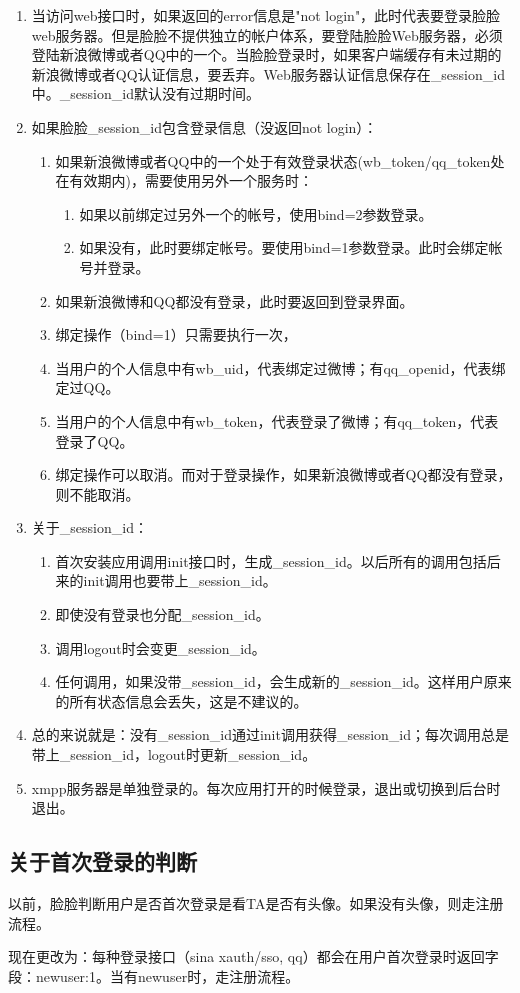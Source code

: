 \begin{enumerate}

\item 当访问web接口时，如果返回的error信息是"not login"，此时代表要登录脸脸web服务器。但是脸脸不提供独立的帐户体系，要登陆脸脸Web服务器，必须登陆新浪微博或者QQ中的一个。当脸脸登录时，如果客户端缓存有未过期的新浪微博或者QQ认证信息，要丢弃。Web服务器认证信息保存在\_session\_id中。\_session\_id默认没有过期时间。
\item 如果脸脸\_session\_id包含登录信息（没返回not login）：
\begin{enumerate}

\item 如果新浪微博或者QQ中的一个处于有效登录状态(wb\_token/qq\_token处在有效期内)，需要使用另外一个服务时：
\begin{enumerate}
\item 如果以前绑定过另外一个的帐号，使用bind=2参数登录。
\item 如果没有，此时要绑定帐号。要使用bind=1参数登录。此时会绑定帐号并登录。
\end{enumerate}

\item 如果新浪微博和QQ都没有登录，此时要返回到登录界面。
\item 绑定操作（bind=1）只需要执行一次，
\item 当用户的个人信息中有wb\_uid，代表绑定过微博；有qq\_openid，代表绑定过QQ。
\item 当用户的个人信息中有wb\_token，代表登录了微博；有qq\_token，代表登录了QQ。
\item 绑定操作可以取消。而对于登录操作，如果新浪微博或者QQ都没有登录，则不能取消。
\end{enumerate}

\item 关于\_session\_id：
\begin{enumerate}
\item 首次安装应用调用init接口时，生成\_session\_id。以后所有的调用包括后来的init调用也要带上\_session\_id。
\item 即使没有登录也分配\_session\_id。
\item 调用logout时会变更\_session\_id。
\item 任何调用，如果没带\_session\_id，会生成新的\_session\_id。这样用户原来的所有状态信息会丢失，这是不建议的。

\end{enumerate}

\item 总的来说就是：没有\_session\_id通过init调用获得\_session\_id；每次调用总是带上\_session\_id，logout时更新\_session\_id。


\item xmpp服务器是单独登录的。每次应用打开的时候登录，退出或切换到后台时退出。


\end{enumerate}


\subsection{关于首次登录的判断}
以前，脸脸判断用户是否首次登录是看TA是否有头像。如果没有头像，则走注册流程。

现在更改为：每种登录接口（sina xauth/sso, qq）都会在用户首次登录时返回字段：{newuser:1}。当有newuser时，走注册流程。
